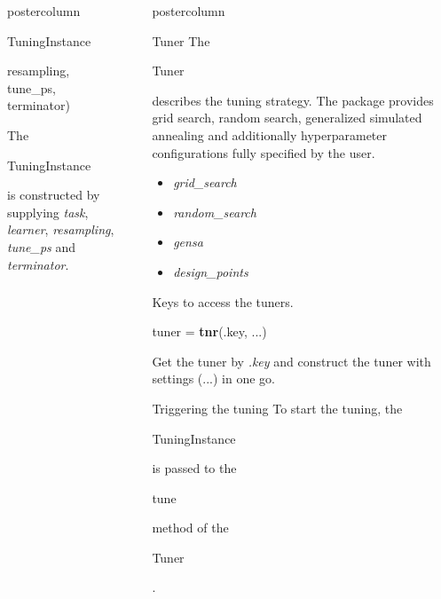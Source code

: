 \documentclass{beamer}
\newlength{\columnheight} %
\newcommand{\codeinline}[1]{\begin{codeboxinline}#1\end{codeboxinline}}
\begin{document}
\begin{frame}[fragile]{}
\begin{columns}
\begin{column}{.245\textwidth}
\begin{beamercolorbox}[center]{postercolumn}
\begin{minipage}{.98\textwidth}
{\begin{myblock}{TuningInstance}
\begin{codeboxmultiline}[width=18cm]
								\hspace*{1ex}resampling,\\
								\hspace*{1ex}tune\_ps,\\
								\hspace*{1ex}terminator)
							\end{codeboxmultiline}
							The \codeinline{TuningInstance} is constructed by supplying \textit{task}, \textit{learner}, \textit{resampling}, \textit{tune\_ps} and \textit{terminator}.
							\\
						\end{myblock}
						\vfill}
				\end{minipage}
			\end{beamercolorbox}
		\end{column}
		\begin{column}{.245\textwidth}
			\begin{beamercolorbox}[center]{postercolumn}
				\begin{minipage}{.98\textwidth}
					\parbox[t][\columnheight]{\textwidth}{
						\begin{myblock}{Tuner}
							The \codeinline{Tuner} describes the tuning strategy. The package provides grid search, random search, generalized simulated annealing and additionally hyperparameter configurations fully specified by the user.
							\begin{itemize}
								\item \textit{grid\_search}
								\item \textit{random\_search}
								\item \textit{gensa}
								\item \textit{design\_points}
							\end{itemize}
							\vspace{0.5cm}
							Keys to access the tuners.
							\\
							\begin{codebox}
								tuner = \textbf{tnr}(.key, ...)
							\end{codebox}
							Get the tuner by \textit{.key} and construct the tuner with settings (...) in one go.
						\end{myblock}
						\begin{myblock}{Triggering the tuning}
							To start the tuning, the \codeinline{TuningInstance} is passed to the \codeinline{tune} method of the \codeinline{Tuner}.
							\\
							\begin{codebox}

\end{codebox}
\end{myblock}}
\end{minipage}
\end{beamercolorbox}
\end{column}
\end{columns}
\end{frame}
\end{document}
